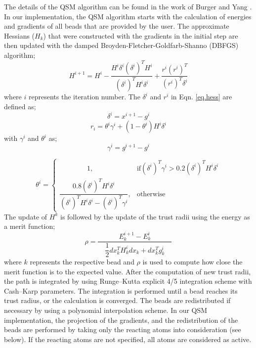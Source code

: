 \documentclass[12pt]{report}
\begin{document}
The details of the QSM
algorithm can be found in the
work of Burger and Yang \cite{Burger2006}.
In our implementation,
the QSM algorithm starts with the calculation of
energies and gradients of all beads
that are provided by the user.
The approximate Hessians ($H_{k}$) that were
constructed with the gradients in the initial step
are then updated with the
damped Broyden-Fletcher-Goldfarb-Shanno (DBFGS) algorithm;
\begin{equation}
H^{i+1} = H^{i} -
\dfrac{H^{i}\delta^{i}(\delta^{i})^{T}H^{i}}
{(\delta^{i})^{T}H^{i}\delta^{i}} +
\dfrac{r^{i}(r^{i})^{T}}
{(r^{i})^{T}\delta^{i}}
\label{eq.hess}
\end{equation}
where $i$ represents the iteration number.
The $\delta^{i}$ and $r^{i}$ in Eqn. \ref{eq.hess}
are defined as;
\begin{equation}
\delta^{i} = x^{i+1} - g^{i}
\end{equation}
\begin{equation}
r_{i} = \theta^{i} \gamma^{i} + (1-\theta^{i})H^{i}\delta^{i}
\end{equation}
with $\gamma^{i}$ and $\theta^{i}$ as;
\begin{equation}
\gamma^{i} = g^{i+1} - g^{i}
\end{equation}

\begin{equation}
\theta^{i}=
\begin{cases}
\qquad \qquad 1, & \text{if} (\delta^{i})^{T}\gamma^{i} >
0.2(\delta^{i})^{T}H^{i}\delta^{i} \\
\dfrac{0.8(\delta^{i})^{T} H^{i} \delta^{i}}
{(\delta^{i})^{T} H^{i} \delta^{i} -
(\delta^{i})^{T} \gamma^{i}}, & \text{otherwise}
\end{cases}
\end{equation}
The update of $H^{k}$ is followed by
the update of the trust radii
using the energy as a merit function;
\begin{equation}
\rho = \dfrac{E_{k}^{i+1} - E_{k}^{i}}
{\quad \dfrac{1}{2} dx_{k}^{T} H_{k}^{i} dx_{k}
+
dx_{k}^{T}g_{k}^{i} \quad}
\end{equation}
where $k$ represents the respective bead
and $\rho$ is used
to compute how close the merit function is to the expected value.
After the computation of new trust radii, the path is integrated
by using Runge--Kutta explicit 4/5 integration scheme
with Cash--Karp parameters. The integration is performed
until a bead
reaches its trust radius, or the calculation is converged.
The beads are redistributed if necessary by using
a polynomial interpolation scheme.
In our QSM implementation,
the projection of the gradients, and the
redistribution of the beads are performed
by taking only the reacting atoms into consideration (see below).
If the reacting atoms are not specified,
all atoms are considered as active.
\end{document}
